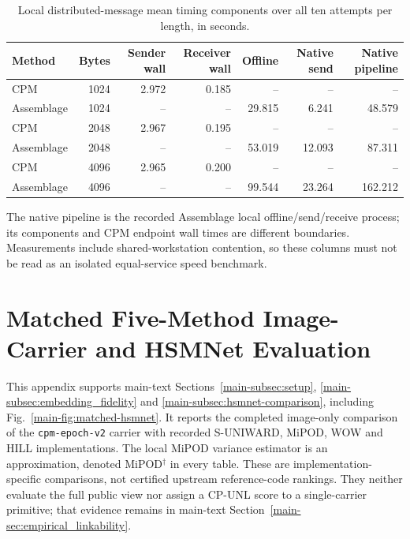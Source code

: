 \documentclass[journal]{IEEEtran}
\renewcommand{\arraystretch}{1.2}
\renewcommand{\arraystretch}{1.0}
\theoremstyle{definition}
\theoremstyle{game}
\renewcommand{\arraystretch}{1.5}
\begin{document}
\begin{table}[!t]
\centering\small
\caption{Local distributed-message mean timing components over all ten attempts per length, in seconds.}
\label{tab:native-system-time}
\setlength{\tabcolsep}{4pt}\renewcommand{\arraystretch}{1.12}
\begin{tabular}{lrrrrrr}
\toprule
Method & Bytes & Sender wall & Receiver wall & Offline & Native send & Native pipeline\\
\midrule
CPM & 1024 & 2.972 & 0.185 & -- & -- & --\\
Assemblage & 1024 & -- & -- & 29.815 & 6.241 & 48.579\\
CPM & 2048 & 2.967 & 0.195 & -- & -- & --\\
Assemblage & 2048 & -- & -- & 53.019 & 12.093 & 87.311\\
CPM & 4096 & 2.965 & 0.200 & -- & -- & --\\
Assemblage & 4096 & -- & -- & 99.544 & 23.264 & 162.212\\
\bottomrule
\end{tabular}
\par\smallskip\parbox{.97\textwidth}{\footnotesize The native pipeline is the recorded Assemblage local offline/send/receive process; its components and CPM endpoint wall times are different boundaries. Measurements include shared-workstation contention, so these columns must not be read as an isolated equal-service speed benchmark.}
\end{table}


\clearpage
\section{Matched Five-Method Image-Carrier and HSMNet Evaluation}
\label{sec:hsmnet-comparison}
This appendix supports main-text Sections~\ref{main-subsec:setup},
\ref{main-subsec:embedding_fidelity} and
\ref{main-subsec:hsmnet-comparison}, including
Fig.~\ref{main-fig:matched-hsmnet}. It reports the completed image-only
comparison of the \texttt{cpm-epoch-v2} carrier with recorded
S-UNIWARD, MiPOD, WOW and HILL implementations. The local MiPOD variance
estimator is an approximation, denoted MiPOD$^\dagger$ in every table.
These are implementation-specific comparisons, not certified upstream
reference-code rankings. They neither evaluate the full public view nor
assign a CP-UNL score to a single-carrier primitive; that evidence remains
in main-text Section~\ref{main-sec:empirical_linkability}.
\end{document}

